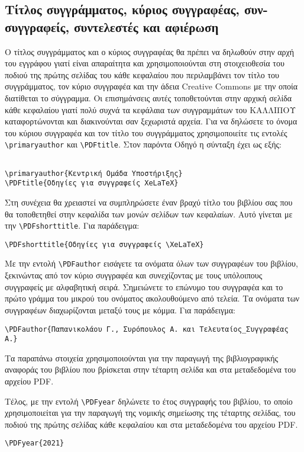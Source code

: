 \begin{refsection}
\subsection[Τίτλος συγγράμματος, κύριος συγγραφέας, συν-συγγραφείς,
\string\hfill\string\break\space συντελεστές και αφιέρωση ]{Τίτλος συγγράμματος, κύριος συγγραφέας, συν-συγγραφείς, συντελεστές και αφιέρωση}
Ο τίτλος συγγράμματος και ο κύριος συγγραφέας θα πρέπει να δηλωθούν στην αρχή του εγγράφου γιατί  είναι
απαραίτητα και χρησιμοποιούνται στη στοιχειοθεσία του ποδιού της πρώτης σελίδας του κάθε κεφαλαίου που
περιλαμβάνει  τον τίτλο του συγγράμματος, τον κύριο συγγραφέα και την άδεια Creative Commons με την οποία διατίθεται το σύγγραμμα. Οι επισημάνσεις αυτές τοποθετούνται στην αρχική σελίδα κάθε κεφαλαίου γιατί πολύ συχνά τα κεφάλαια των συγγραμμάτων του ΚΑΛΛΙΠΟΥ καταφορτώνονται και διακινούνται σαν ξεχωριστά αρχεία. Για να δηλώσετε το όνομα του κύριου συγγραφέα και τον τίτλο του συγγράμματος χρησιμοποιείτε τις εντολές \verb|\primaryauthor| και \verb|\PDFtitle|. Στον παρόντα Οδηγό η σύνταξη έχει ως εξής:
\begin{verbatim}

\primaryauthor{Κεντρική Ομάδα Υποστήριξης}
\PDFtitle{Οδηγίες για συγγραφείς XeLaTeX}
\end{verbatim}

Στη συνέχεια θα χρειαστεί να συμπληρώσετε έναν βραχύ τίτλο του βιβλίου σας που θα τοποθετηθεί στην κεφαλίδα
των μονών σελίδων των κεφαλαίων. Αυτό γίνεται με την \verb|\PDFshorttitle|. Για παράδειγμα:
\begin{verbatim}
\PDFshorttitle{Οδηγίες για συγγραφείς \XeLaTeX}
\end{verbatim}

Με την εντολή \verb|\PDFauthor| εισάγετε τα ονόματα όλων των συγγραφέων του βιβλίου, ξεκινώντας από τον κύριο συγγραφέα και συνεχίζοντας με τους υπόλοιπους συγγραφείς με αλφαβητική σειρά. Σημειώνετε το επώνυμο του συγγραφέα και το πρώτο γράμμα του μικρού του ονόματος ακολουθούμενο από τελεία. Τα ονόματα των συγγραφέων διαχωρίζονται μεταξύ τους με κόμμα. Για παράδειγμα:
\begin{verbatim}
\PDFauthor{Παπανικολάου Γ., Συρόπουλος Α. και Τελευταίος_Συγγραφέας Α.}
\end{verbatim}
Τα παραπάνω στοιχεία χρησιμοποιούνται για την παραγωγή της βιβλιογραφικής αναφοράς του βιβλίου που βρίσκεται
στην τέταρτη σελίδα και στα μεταδεδομένα του αρχείου PDF.

Τέλος, με την εντολή \verb|\PDFyear| δηλώνετε το έτος συγγραφής του βιβλίου, το οποίο χρησιμοποιείται για την παραγωγή της νομικής σημείωσης της τέταρτης σελίδας, του ποδιού της πρώτης σελίδας κάθε κεφαλαίου και στα μεταδεδομένα του αρχείου PDF.
\begin{verbatim}
\PDFyear{2021}
\end{verbatim}


\end{refsection}

